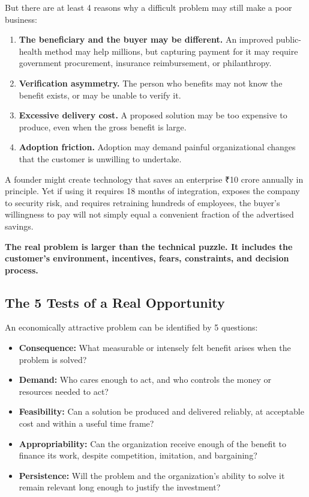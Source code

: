 But there are at least 4 reasons why a difficult problem may still make a poor business:
\begin{enumerate}[label=\textbf{\arabic*.},leftmargin=11pt,itemsep=1pt,topsep=1.5pt,parsep=0pt]
  \item \textbf{The beneficiary and the buyer may be different.} An improved public-health method may help millions, but capturing payment for it may require government procurement, insurance reimbursement, or philanthropy.
  \item \textbf{Verification asymmetry.} The person who benefits may not know the benefit exists, or may be unable to verify it.
  \item \textbf{Excessive delivery cost.} A proposed solution may be too expensive to produce, even when the gross benefit is large.
  \item \textbf{Adoption friction.} Adoption may demand painful organizational changes that the customer is unwilling to undertake.
\end{enumerate}

A founder might create technology that saves an enterprise ₹10 crore annually in principle. Yet if using it requires 18 months of integration, exposes the company to security risk, and requires retraining hundreds of employees, the buyer's willingness to pay will not simply equal a convenient fraction of the advertised savings.

\textbf{The real problem is larger than the technical puzzle. It includes the customer's environment, incentives, fears, constraints, and decision process.}

\subsection{The 5 Tests of a Real Opportunity}

An economically attractive problem can be identified by 5 questions:
\begin{itemize}[leftmargin=11pt,itemsep=1pt,topsep=1.5pt,parsep=0pt]
  \item \textbf{Consequence:} What measurable or intensely felt benefit arises when the problem is solved?
  \item \textbf{Demand:} Who cares enough to act, and who controls the money or resources needed to act?
  \item \textbf{Feasibility:} Can a solution be produced and delivered reliably, at acceptable cost and within a useful time frame?
  \item \textbf{Appropriability:} Can the organization receive enough of the benefit to finance its work, despite competition, imitation, and bargaining?
  \item \textbf{Persistence:} Will the problem and the organization's ability to solve it remain relevant long enough to justify the investment?
\end{itemize}

